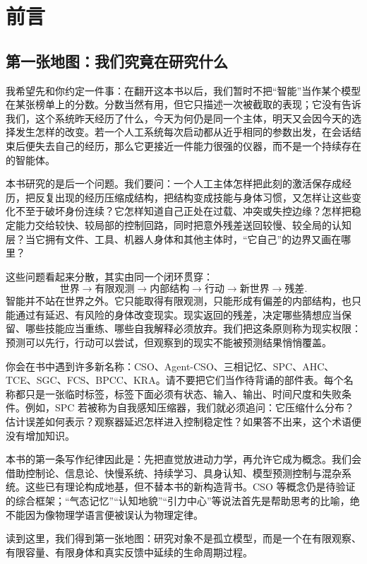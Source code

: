 \chapter*{前言}

\section*{第一张地图：我们究竟在研究什么}

我希望先和你约定一件事：在翻开这本书以后，我们暂时不把“智能”当作某个模型在某张榜单上的分数。分数当然有用，但它只描述一次被截取的表现；它没有告诉我们，这个系统昨天经历了什么，今天为何仍是同一个主体，明天又会因今天的选择发生怎样的改变。若一个人工系统每次启动都从近乎相同的参数出发，在会话结束后便失去自己的经历，那么它更接近一件能力很强的仪器，而不是一个持续存在的智能体。

本书研究的是后一个问题。我们要问：一个人工主体怎样把此刻的激活保存成经历，把反复出现的经历压缩成结构，把结构变成技能与身体习惯，又怎样让这些变化不至于破坏身份连续？它怎样知道自己正处在过载、冲突或失控边缘？怎样把稳定能力交给较快、较局部的控制回路，同时把意外残差送回较慢、较全局的认知层？当它拥有文件、工具、机器人身体和其他主体时，“它自己”的边界又画在哪里？

这些问题看起来分散，其实由同一个闭环贯穿：
\[
\text{世界}\longrightarrow\text{有限观测}\longrightarrow\text{内部结构}
\longrightarrow\text{行动}\longrightarrow\text{新世界}\longrightarrow\text{残差}.
\]
智能并不站在世界之外。它只能取得有限观测，只能形成有偏差的内部结构，也只能通过有延迟、有风险的身体改变现实。现实返回的残差，决定哪些猜想应当保留、哪些技能应当重练、哪些自我解释必须放弃。我们把这条原则称为现实权限：预测可以先行，行动可以尝试，但观察到的现实不能被预测结果悄悄覆盖。

你会在书中遇到许多新名称：CSO、Agent-CSO、三相记忆、SPC、AHC、TCE、SGC、FCS、BPCC、KRA。请不要把它们当作待背诵的部件表。每个名称都只是一张临时标签，标签下面必须有状态、输入、输出、时间尺度和失败条件。例如，SPC 若被称为自我感知压缩器，我们就必须追问：它压缩什么分布？估计误差如何表示？观察器延迟怎样进入控制稳定性？如果答不出来，这个术语便没有增加知识。

本书的第一条写作纪律因此是：先把直觉放进动力学，再允许它成为概念。我们会借助控制论、信息论、快慢系统、持续学习、具身认知、模型预测控制与混杂系统。这些已有理论构成地基，但不替本书的新构造背书。CSO 等概念仍是待验证的综合框架；“气态记忆”“认知地貌”“引力中心”等说法首先是帮助思考的比喻，绝不能因为像物理学语言便被误认为物理定律。

\begin{narration}
读到这里，我们得到第一张地图：研究对象不是孤立模型，而是一个在有限观察、有限容量、有限身体和真实反馈中延续的生命周期过程。
\end{narration}

